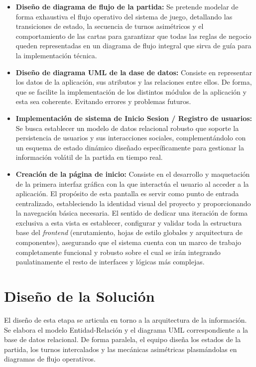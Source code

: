 \begin{itemize}
    \item \textbf{Diseño de diagrama de flujo de la partida:} Se pretende modelar de forma exhaustiva el flujo operativo del sistema de juego, detallando las transiciones de estado, la secuencia de turnos asimétricos y el comportamiento de las cartas para garantizar que todas las reglas de negocio queden representadas en un diagrama de flujo integral que sirva de guía para la implementación técnica.
    \item \textbf{Diseño de diagrama UML de la dase de datos:} Consiste en representar los datos de la aplicación, sus atributos y las relaciones entre ellos. De forma, que se facilite la implementación de los distintos módulos de la aplicación y esta sea coherente. Evitando errores y problemas futuros.
    \item \textbf{Implementación de sistema de Inicio Sesion / Registro de usuarios:} Se busca establecer un modelo de datos relacional robusto que soporte la persistencia de usuarios y sus interacciones sociales, complementándolo con un esquema de estado dinámico diseñado específicamente para gestionar la información volátil de la partida en tiempo real.
    \item \textbf{Creación de la página de inicio:} Consiste en el desarrollo y maquetación de la primera interfaz gráfica con la que interactúa el usuario al acceder a la aplicación. El propósito de esta pantalla es servir como punto de entrada centralizado, estableciendo la identidad visual del proyecto y proporcionando la navegación básica necesaria. El sentido de dedicar una iteración de forma exclusiva a esta vista es establecer, configurar y validar toda la estructura base del \textit{frontend} (enrutamiento, hojas de estilo globales y arquitectura de componentes), asegurando que el sistema cuenta con un marco de trabajo completamente funcional y robusto sobre el cual se irán integrando paulatinamente el resto de interfaces y lógicas más complejas.
\end{itemize}

\section{Diseño de la Solución}
El diseño de esta etapa se articula en torno a la arquitectura de la información. Se elabora el modelo Entidad-Relación y el diagrama UML correspondiente a la base de datos relacional. De forma paralela, el equipo diseña los estados de la partida, los turnos intercalados y las mecánicas asimétricas plasmándolas en diagramas de flujo operativos.


